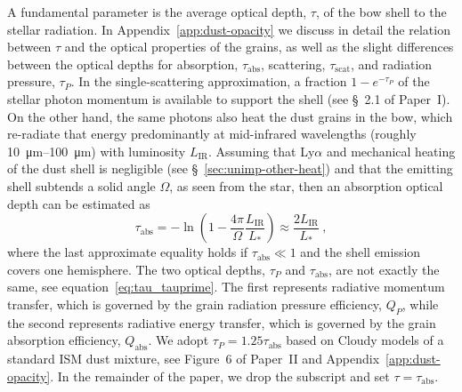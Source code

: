 \documentclass[useAMS, usenatbib, a4paper]{mnras}
\newcommand\IR{\ensuremath{_{\text{IR}}}}
\begin{document}
A fundamental parameter is the average optical depth, \(\tau\), of the
bow shell to the stellar radiation. In Appendix~\ref{app:dust-opacity}
we discuss in detail the relation between \(\tau\) and the optical
properties of the grains, as well as the slight differences between
the optical depths for absorption, \(\tau_{\text{abs}}\), scattering,
\(\tau_{\text{scat}}\), and radiation pressure, \(\tau_P\).  In the
single-scattering approximation, a fraction \(1 - e^{-\tau_P}\) of the
stellar photon momentum is available to support the shell (see \S~2.1
of Paper~I).  On the other hand, the same photons also heat the dust
grains in the bow, which re-radiate that energy predominantly at
mid-infrared wavelengths (roughly \SIrange{10}{100}{\um}) with
luminosity \(L\IR\).  Assuming that Ly\(\alpha\) and mechanical heating of
the dust shell is negligible (see \S~\ref{sec:unimp-other-heat}) and
that the emitting shell subtends a solid angle \(\Omega\), as seen from the
star, then an absorption optical depth can be estimated as
\begin{equation}
  \label{eq:tau-empirical}
  \tau_{\text{abs}} = -\ln \left( 1 - \frac{4\pi}{\Omega} \frac{L\IR}{L_*} \right)
  \approx \frac{2 L\IR}{L_*} \ ,
\end{equation}
where the last approximate equality holds if
\(\tau_{\text{abs}} \ll 1\) and the shell emission covers one hemisphere.
The two optical depths, \(\tau_P\) and \(\tau_{\text{abs}}\), are not
exactly the same, see equation~\eqref{eq:tau_tauprime}.  The first
represents radiative momentum transfer, which is governed by the grain
radiation pressure efficiency, \(Q_P\), while the second represents
radiative energy transfer, which is governed by the grain absorption
efficiency, \(Q_{\text{abs}}\).  We adopt
\(\tau_P = 1.25 \tau_{\text{abs}}\) based on Cloudy models of a standard ISM
dust mixture, see Figure~6 of Paper~II and
Appendix~\ref{app:dust-opacity}.  In the remainder of the paper, we
drop the subscript and set \(\tau = \tau_{\text{abs}}\).
\end{document}
